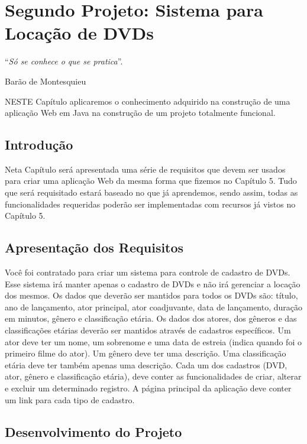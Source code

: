 \chapter{Segundo Projeto: Sistema para Locação de DVDs}\label{cap:segundoProjeto}
\epigraph{``\textit{Só se conhece o que se pratica}''.}{Barão de Montesquieu}

\lettrine[lines=4, lhang=0.1, lraise=0, loversize=0.2, findent=0.1em]{\textcolor{corAzulTema}{N}}{ESTE} Capítulo aplicaremos o conhecimento adquirido na construção de uma aplicação Web em Java na construção de um projeto totalmente funcional.


\section{Introdução}

Neta Capítulo será apresentada uma série de requisitos que devem ser usados para criar uma aplicação Web da mesma forma que fizemos no Capítulo 5. Tudo que será requisitado estará baseado no que já aprendemos, sendo assim, todas as funcionalidades requeridas poderão ser implementadas com recursos já vistos no Capítulo 5.


\section{Apresentação dos Requisitos}

Você foi contratado para criar um sistema para controle de cadastro de DVDs. Esse sistema irá manter apenas o cadastro de DVDs e não irá gerenciar a locação dos mesmos. Os dados que deverão ser mantidos para todos os DVDs são: título, ano de lançamento, ator principal, ator coadjuvante, data de lançamento, duração em minutos, gênero e classificação etária. Os dados dos atores, dos gêneros e das classificações etárias deverão ser mantidos através de cadastros específicos. Um ator deve ter um nome, um sobrenome e uma data de estreia (indica quando foi o primeiro filme do ator). Um gênero deve ter uma descrição. Uma classificação etária deve ter também apenas uma descrição. Cada um dos cadastros (DVD, ator, gênero e classificação etária), deve conter as funcionalidades de criar, alterar e excluir um determinado registro. A página principal da aplicação deve conter um link para cada tipo de cadastro.


\section{Desenvolvimento do Projeto}

